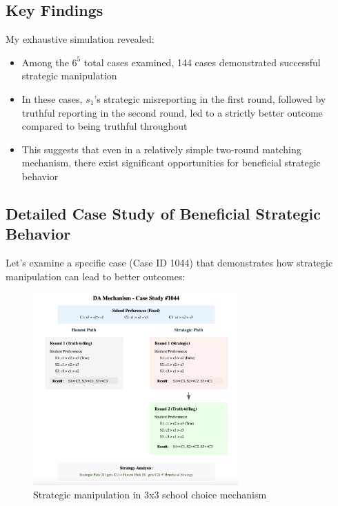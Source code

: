 \documentclass{article}
\begin{document}
\subsection{Key Findings}
My exhaustive simulation revealed:
\begin{itemize}
    \item Among the $6^5$ total cases examined, 144 cases demonstrated successful strategic manipulation
    \item In these cases, $s_1$'s strategic misreporting in the first round, followed by truthful reporting in the second round, led to a strictly better outcome compared to being truthful throughout
    \item This suggests that even in a relatively simple two-round matching mechanism, there exist significant opportunities for beneficial strategic behavior
\end{itemize}

\subsection{Detailed Case Study of Beneficial Strategic Behavior}
Let's examine a specific case (Case ID 1044) that demonstrates how strategic manipulation can lead to better outcomes:

\begin{figure}[h]
\centering
\includegraphics[width=0.7\textwidth]{3*3.png}
\caption{Strategic manipulation in 3x3 school choice mechanism}
\end{figure}
\end{document}
